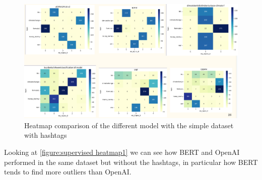 \begin{figure}[h]
    \centering %
        \includegraphics[width=0.99\linewidth]{Chapter4/figures/topic_heatmap1.png} 
    \caption{Heatmap comparison of the different model with the simple dataset with hashtags
    }
    \label{figure:sup_heatmap1_simple_hash} %
\end{figure}

Looking at \ref{figure:supervised heatmap1} we can see how BERT and OpenAI performed in the same dataset but without the hashtags, in particular how BERT tends to find more outliers than OpenAI.


